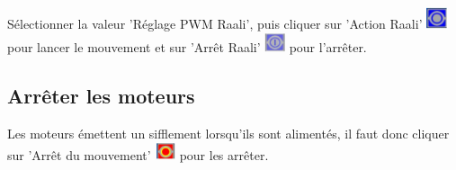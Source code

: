 Sélectionner la valeur 'Réglage PWM Raali', puis cliquer sur 'Action Raali' \includegraphics[width=0.6cm]{img/robot_jockey_ico_05} pour lancer le mouvement et sur 'Arrêt Raali' \includegraphics[width=0.6cm]{img/robot_jockey_ico_06} pour l'arrêter.

\subsection{Arrêter les moteurs}

Les moteurs émettent un sifflement lorsqu'ils sont alimentés, il faut donc cliquer sur 'Arrêt du mouvement' \includegraphics[width=0.6cm]{img/robot_jockey_ico_07} pour les arrêter.


